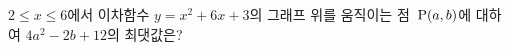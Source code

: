 $2\le x\le 6$에서 이차함수 $y=x^2+6x+3$의 그래프 위를 움직이는 점~$\mathrm{P}(a{,}\mkern3mu\mathopen{}b)$에 대하여 $4a^2-2b+12$의 최댓값은?

